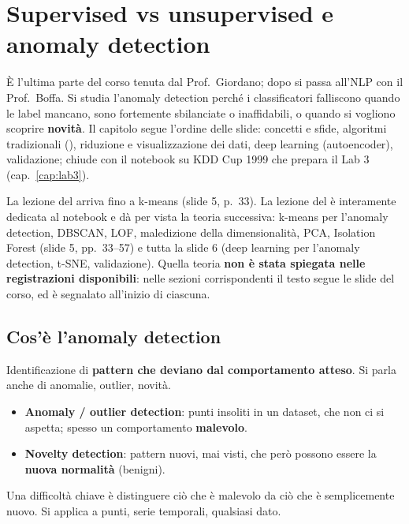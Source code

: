 \chapter{Supervised vs unsupervised e anomaly detection}
\label{cap:anomaly}

È l'ultima parte del corso tenuta dal Prof.\ Giordano; dopo si passa all'NLP con il Prof.\ Boffa. Si studia l'anomaly detection perché
i classificatori falliscono quando le label mancano, sono fortemente sbilanciate o inaffidabili, o quando si vogliono scoprire
\textbf{novità}. Il capitolo segue l'ordine delle slide: concetti e sfide, algoritmi tradizionali (), riduzione e
visualizzazione dei dati, deep learning (autoencoder), validazione; chiude con il notebook su KDD Cup 1999 che prepara il Lab 3
(cap.~\ref{cap:lab3}).

\begin{nota}
La lezione del  arriva fino a k-means (slide 5, p.~33). La lezione del  è interamente dedicata
al notebook e dà per vista la teoria successiva: k-means per l'anomaly detection, DBSCAN, LOF, maledizione della dimensionalità, PCA,
Isolation Forest (slide 5, pp.\ 33--57) e tutta la slide 6 (deep learning per l'anomaly detection, t-SNE, validazione). Quella teoria
\textbf{non è stata spiegata nelle registrazioni disponibili}: nelle sezioni corrispondenti il testo segue le slide del corso, ed è
segnalato all'inizio di ciascuna.
\end{nota}

\section{Cos'è l'anomaly detection}
\begin{definizione}
Identificazione di \textbf{pattern che deviano dal comportamento atteso}. Si parla anche di anomalie, outlier, novità.
\begin{itemize}
  \item \textbf{Anomaly / outlier detection}: punti insoliti in un dataset, che non ci si aspetta; spesso un comportamento \textbf{malevolo}.
  \item \textbf{Novelty detection}: pattern nuovi, mai visti, che però possono essere la \textbf{nuova normalità} (benigni).
\end{itemize}
\end{definizione}
Una difficoltà chiave è distinguere ciò che è malevolo da ciò che è semplicemente nuovo. Si applica a punti, serie temporali, qualsiasi dato.

